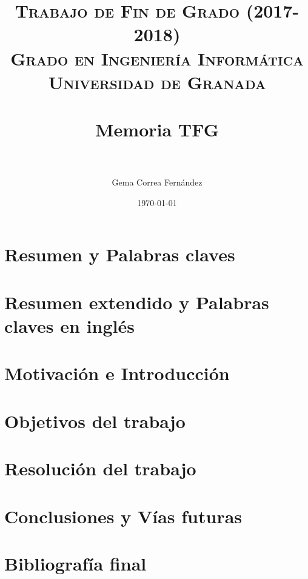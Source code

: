\documentclass[a4paper,spanish]{article}
\title{
	\normalfont \normalsize 
	\textsc{{\bf Trabajo de Fin de Grado (2017-2018)} \\ 
		Grado en Ingeniería Informática \\ Universidad de Granada} \\ [25pt] 
	\horrule{0.5pt} \\[0.4cm] 
	\huge Memoria TFG \\
	\horrule{2pt} \\[0.5cm]
}
\author{Gema Correa Fernández}
\date{\normalsize\today}
\begin{document}
	
\maketitle
	
	

\section{Resumen y Palabras claves}

\section{Resumen extendido y Palabras claves en inglés}

\section{Motivación e Introducción}

\section{Objetivos del trabajo}

\section{Resolución del trabajo}

\section{Conclusiones y Vías futuras}

\section{Bibliografía final}
\end{document}
